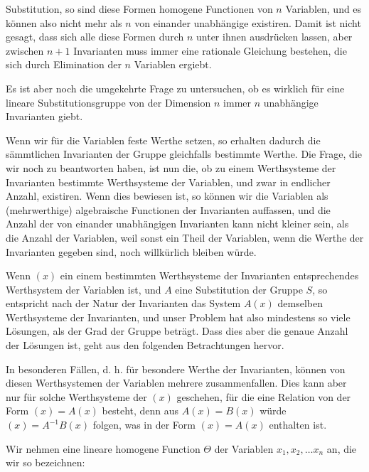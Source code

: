 Substitution, so sind diese Formen homogene Functionen von
$n$ Variablen, und es können also nicht mehr als $n$ von einander
unabhängige existiren. Damit ist nicht gesagt, dass sich alle
diese Formen  durch $n$ unter ihnen ausdrücken lassen,
aber zwischen $n+1$ Invarianten muss immer eine rationale
Gleichung bestehen, die sich durch Elimination der $n$ Variablen
ergiebt.

Es ist aber noch die umgekehrte Frage zu untersuchen, ob
es wirklich für eine lineare Substitutionsgruppe von der Dimension
$n$ immer $n$ unabhängige Invarianten giebt.

Wenn wir für die Variablen feste Werthe setzen, so erhalten
dadurch die sämmtlichen Invarianten der Gruppe gleichfalls
bestimmte Werthe. Die Frage, die wir noch zu beantworten
haben, ist nun die, ob zu einem Werthsysteme der Invarianten
bestimmte Werthsysteme der Variablen, und zwar in endlicher
Anzahl, existiren. Wenn dies bewiesen ist, so können wir die
Variablen als (mehrwerthige) algebraische Functionen der Invarianten
auffassen, und die Anzahl der von einander unabhängigen
Invarianten kann nicht kleiner sein, als die Anzahl
der Variablen, weil sonst ein Theil der Variablen, wenn die
Werthe der Invarianten gegeben sind, noch willkürlich bleiben
würde.

Wenn $(x)$ ein einem bestimmten Werthsysteme der Invarianten
entsprechendes Werthsystem der Variablen ist, und $A$ eine Substitution
der Gruppe $S$, so entspricht nach der Natur der Invarianten
das System $A(x)$ demselben Werthsysteme der Invarianten,
und unser Problem hat also mindestens so viele
Lösungen, als der Grad der Gruppe beträgt. Dass dies aber die
genaue Anzahl der Lösungen ist, geht aus den folgenden Betrachtungen
hervor.

In besonderen Fällen, d. h. für besondere Werthe der Invarianten,
können von diesen Werthsystemen der Variablen
mehrere zusammenfallen. Dies kann aber nur für solche Werthsysteme
der $(x)$ geschehen, für die eine Relation von der Form
$(x) = A(x)$ besteht, denn aus $A(x) = B(x)$ würde $(x) = A^{-1}B(x)$
folgen, was in der Form $(x) = A(x)$ enthalten ist.

Wir nehmen eine lineare homogene Function $\Theta$ der Variablen
$x_1, x_2, \dots x_n$ an, die wir so bezeichnen:
